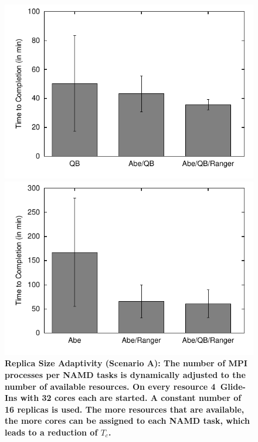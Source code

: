 \documentclass{rspublic}
\begin{document}
\begin{figure}[h]
  \begin{minipage}[t]{.48\textwidth}
    \begin{center}  
      \includegraphics[width=\textwidth]{performance/perf_distributed_size_replica.pdf}
      \caption{\footnotesize \bf Replica Size Adaptivity (Scenario A):
      The number of MPI processes per NAMD tasks is dynamically adjusted to the number 
      of available resources. On every resource 4~Glide-Ins with 32 cores each are
      started. A constant number of 16 replicas is used. 
      The more resources that are available, the more cores can be 
      assigned to each NAMD task, which leads to a reduction of $T_{c}$.
      }
      \label{fig:performance_perf_distributed_A}
    \end{center}
  \end{minipage}
  \hfill
  \begin{minipage}[t]{.485\textwidth}
    \begin{center}  
      \includegraphics[width=\textwidth]{performance/perf_distributed_number_replica.pdf}

\end{center}
\end{minipage}
\end{figure}
\end{document}
